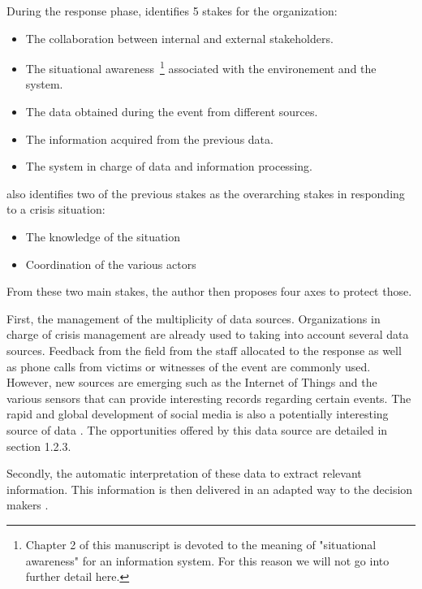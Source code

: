 During the response phase, \cite[.~12--18]{fertierInterpretationAutomatiqueDonnees2018a} identifies 5 stakes for the organization:

\begin{itemize}
    \item The collaboration between internal and external stakeholders.
    \item The situational awareness~\footnote{Chapter 2 of this manuscript is devoted to the meaning of "situational awareness" for an information system. For this reason we will not go into further detail here.} associated with the environement and the system.
    \item The data obtained during the event from different sources.
    \item The information acquired from the previous data.
    \item The system in charge of data and information processing.
\end{itemize}

\textcite{batardIntegrerContributionsCitoyennes2021} also identifies two of the previous stakes as the overarching stakes in responding to a crisis situation:

\begin{itemize}
    \item The knowledge of the situation
    \item Coordination of the various actors
\end{itemize}

From these two main stakes, the author then proposes four axes to protect those.

First, the management of the multiplicity of data sources.
Organizations in charge of crisis management are already used to taking into account several data sources.
Feedback from the field from the staff allocated to the response as well as phone calls from victims or witnesses of the event are commonly used.
However, new sources are emerging such as the Internet of Things and the various sensors that can provide interesting records regarding certain events.
The rapid and global development of social media is also a potentially interesting source of data \cite{meierStrengtheningHumanitarianInformation2013}.
The opportunities offered by this data source are detailed in section 1.2.3.

Secondly, the automatic interpretation of these data to extract relevant information.
This information is then delivered in an adapted way to the decision makers \cite{luokkalaDevelopingInformationSystems2014,vandewalleImprovingSituationAwareness2016}.

